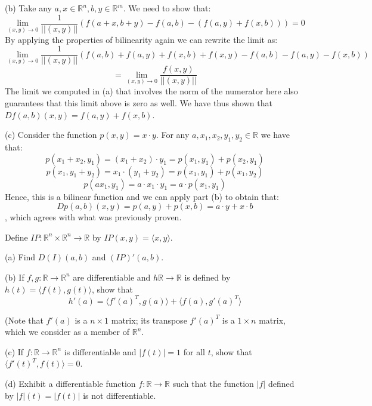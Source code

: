 \begin{solution}
    (b) Take any $a, x \in \mathbb{R}^n, b, y \in \mathbb{R}^m$.
    We need to show that:
    $$\lim_{(x, y) \rightarrow 0} \frac{1}{\lvert \lvert (x, y) \rvert \rvert}(f(a + x, b + y) - f(a, b) - (f(a, y) + f(x, b))) = 0$$
    By applying the properties of bilinearity again we can rewrite the limit as:
    $$\lim_{(x, y) \rightarrow 0} \frac{1}{\lvert \lvert (x, y) \rvert \rvert}(f(a, b) + f(a, y) + f(x, b) + f(x, y) - f(a, b) - f(a, y) - f(x, b))$$
    $$= \lim_{(x, y) \rightarrow 0} \frac{f(x, y)}{\lvert \lvert (x, y) \rvert \rvert}$$
    The limit we computed in (a) that involves the norm of the numerator here also guarantees that this limit above is zero as well.
    We have thus shown that $D f(a, b)(x, y) = f(a, y) + f(x, b)$.

    (c) Consider the function $p(x, y) = x \cdot y$.
    For any $a, x_1, x_2, y_1, y_2 \in \mathbb{R}$ we have that:
    $$p(x_1 + x_2, y_1) = (x_1 + x_2)\cdot y_1 = p(x_1, y_1) + p(x_2, y_1)$$
    $$p(x_1, y_1 + y_2) = x_1\cdot (y_1 + y_2) = p(x_1, y_1) + p(x_1, y_2)$$
    $$p(a x_1, y_1) = a \cdot x_1 \cdot y_1 = a \cdot p(x_1, y_1)$$
    Hence, this is a bilinear function and we can apply part (b) to obtain that:
    $$D p (a, b)(x, y) = p(a, y) + p(x, b) = a \cdot y + x \cdot b$$,
    which agrees with what was previously proven.
\end{solution}

\begin{exercise}{13}
    Define $IP: \mathbb{R}^n \times \mathbb{R}^n \rightarrow \mathbb{R}$ by $IP(x, y) = \langle x, y \rangle$.

    (a) Find $D(I)(a, b)$ and $(IP)'(a, b)$.

    (b) If $f, g: \mathbb{R} \rightarrow \mathbb{R}^n$ are differentiable and $h \mathbb{R} \rightarrow \mathbb{R}$ is defined by $h(t) =  \langle f(t), g(t) \rangle$, show that
    $$h'(a) = \langle f'(a)^T, g(a) \rangle + \langle f(a), g'(a)^T \rangle$$

    (Note that $f'(a)$ is a $n \times 1$ matrix; its transpose $f'(a)^T$ is a $1 \times n$ matrix, which we consider as a member of $\mathbb{R}^n$.

    (c) If $f: \mathbb{R} \rightarrow \mathbb{R}^n$ is differentiable and $\lvert f(t) \rvert = 1$ for all $t$, show that $\langle f'(t)^T, f(t) \rangle = 0$.

    (d) Exhibit a differentiable function $f: \mathbb{R} \rightarrow \mathbb{R}$ such that the function $\lvert f \rvert$ defined by $\lvert f \rvert(t) = \lvert f(t) \rvert$ is not differentiable.
\end{exercise}

